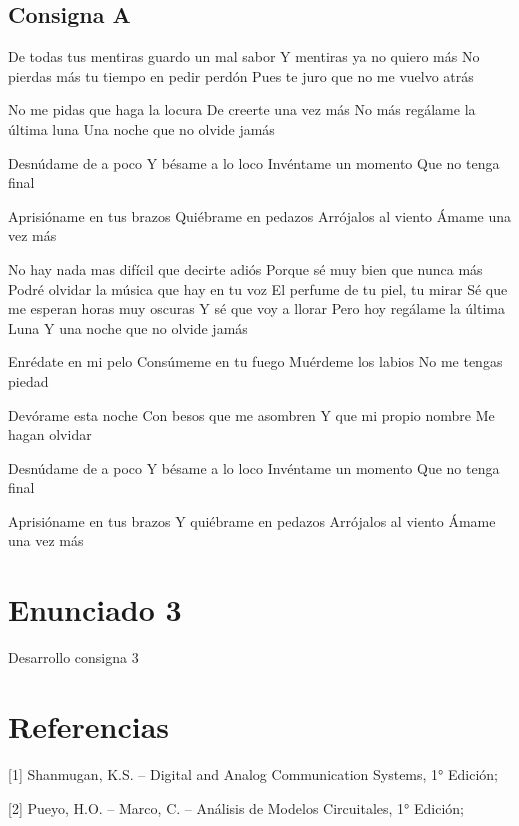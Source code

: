 \documentclass[a4paper, 12pt]{article}
\begin{document}
\subsection{Consigna A}
\begin{multicols}{2}
De todas tus mentiras guardo un mal sabor
Y mentiras ya no quiero más
No pierdas más tu tiempo en pedir perdón
Pues te juro que no me vuelvo atrás

No me pidas que haga la locura
De creerte una vez más
No más regálame la última luna
Una noche que no olvide jamás

Desnúdame de a poco
Y bésame a lo loco
Invéntame un momento
Que no tenga final

Aprisióname en tus brazos
Quiébrame en pedazos
Arrójalos al viento
Ámame una vez más

No hay nada mas difícil que decirte adiós
Porque sé muy bien que nunca más
Podré olvidar la música que hay en tu voz
El perfume de tu piel, tu mirar
Sé que me esperan horas muy oscuras
Y sé que voy a llorar
Pero hoy regálame la última Luna
Y una noche que no olvide jamás

Enrédate en mi pelo
Consúmeme en tu fuego
Muérdeme los labios
No me tengas piedad

Devórame esta noche
Con besos que me asombren
Y que mi propio nombre
Me hagan olvidar

Desnúdame de a poco
Y bésame a lo loco
Invéntame un momento
Que no tenga final

Aprisióname en tus brazos
Y quiébrame en pedazos
Arrójalos al viento
Ámame una vez más
\end{multicols}
\section{Enunciado 3}
Desarrollo consigna 3

\newpage
\section{Referencias}
 
[1] Shanmugan, K.S. -- Digital and Analog Communication Systems, 1° Edición;

[2] Pueyo, H.O. -- Marco, C. -- Análisis de Modelos Circuitales, 1° Edición;
\end{document}
